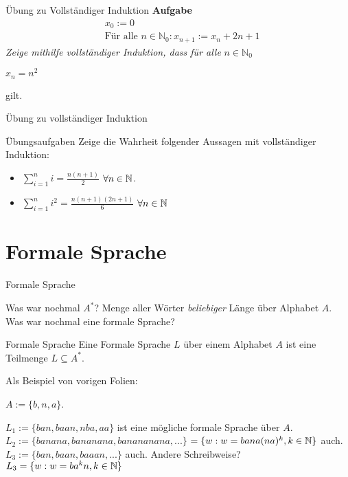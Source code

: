 \begin{frame}{Übung zu Vollständiger Induktion}
	\textbf{Aufgabe}\\
	\begin{eqnarray*}
		&x_0 := 0\\
		&\text{Für alle } n \in \mathbb{N}_0: x_{n+1} := x_n + 2n +1
	\end{eqnarray*}			
	\textit{Zeige mithilfe vollständiger Induktion, dass für alle} $n \in \mathbb{N}_0$ \\
	\begin{center}$x_n = n^2$\end{center}
	gilt.
\end{frame}

\begin{frame}{Übung zu vollständiger Induktion}
	\begin{taskblock}{Übungsaufgaben}
		Zeige die Wahrheit folgender Aussagen mit vollständiger Induktion:
		
		\begin{itemize}
			\item $\sum\limits_{i=1}^n i = \frac{n(n+1)}{2}$ $\forall n \in \mathbb{N}$.
			\item $\sum\limits_{i=1}^n i^2 = \frac{n(n+1)(2n+1)}{6}$ $\forall n \in \mathbb{N}$
		\end{itemize}
	\end{taskblock}
\end{frame}

\section{Formale Sprache}

\begin{frame}{Formale Sprache}
	\begin{itemize}
		\pitem Was war nochmal $A^*$? Menge aller Wörter \emph{beliebiger} Länge über Alphabet $A$.
		\pitem Was war nochmal eine formale Sprache?
	\end{itemize}
	
	\pause
	
	\begin{block}{Formale Sprache}
		Eine Formale Sprache $L$ \pause über einem Alphabet $A$ ist eine Teilmenge $L \subseteq A^*$.
	\end{block}

	\pause Als Beispiel von vorigen Folien:
	
	\begin{itemize}
		\pitem $A := \{b, n, a\}$.
		\begin{itemize}
			\pitem $L_1 := \{ban, baan, nba, aa\}$ ist eine mögliche formale Sprache über $A$.
			\pitem $L_2 := \{banana, bananana, banananana, ...\}$ \pause $ = \{w : w = bana(na)^k, k \in \mathbb{N}\}$ auch.
			\pitem $L_3 := \{ban, baan, baaan, ...\}$ auch. \pause Andere Schreibweise? \pause \\ $ L_3 = \{w : w = ba^kn, k \in \mathbb{N} \}$
		\end{itemize}
	\end{itemize}
\end{frame}

